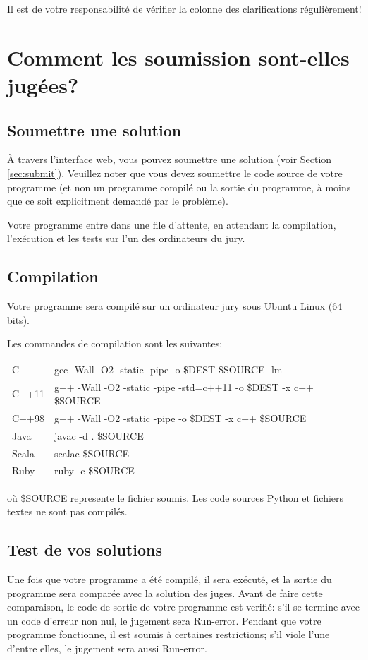 Il est de votre responsabilité de vérifier la colonne
des clarifications régulièrement!

\section[Comment les soumission sont-elles jugées?]{Comment les soumission sont-elles jugées?}
\subsection{Soumettre une solution}
À travers l'interface web, vous pouvez soumettre une solution
(voir Section \ref{sec:submit}). Veuillez noter que vous devez 
soumettre le code source de votre programme 
(et non un programme compilé ou la sortie du programme,
à moins que ce soit explicitment demandé par le problème).

Votre programme entre dans une file d'attente, 
en attendant la compilation, l'exécution et les tests 
sur l'un des ordinateurs du jury.

\subsection{Compilation}
Votre programme sera compilé sur un ordinateur jury sous Ubuntu Linux
(64 bits).

Les commandes de compilation sont les suivantes:
\begin{center}
\begin{tabular}{l|p{14cm}}
C&
gcc -Wall -O2 -static -pipe -o \$DEST \$SOURCE -lm \\
C++11&
g++ -Wall -O2 -static -pipe -std=c++11 -o \$DEST -x c++ \$SOURCE \\
C++98&
g++ -Wall -O2 -static -pipe -o \$DEST -x c++ \$SOURCE \\
Java&
javac -d . \$SOURCE \\
Scala&
scalac \$SOURCE \\
Ruby&
ruby -c \$SOURCE \\
\end{tabular}
\end{center}
où \$SOURCE represente le fichier soumis.
Les code sources Python et fichiers textes ne sont pas compilés.

\subsection{Test de vos solutions}
Une fois que votre programme a été compilé, il sera exécuté, et la
sortie du programme sera comparée avec la solution des juges. Avant
de faire cette comparaison, le code de sortie de votre
programme est verifié: s'il se termine avec un code d'erreur non nul,
le jugement sera \og Run-error\fg{}. Pendant que votre programme 
fonctionne, il est soumis à certaines restrictions; 
s'il viole l'une d'entre elles, le jugement sera
aussi \og Run-error\fg{}.


